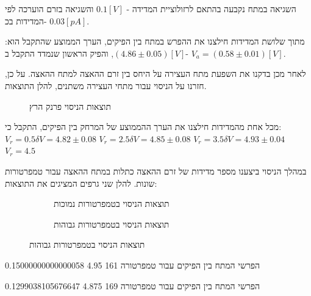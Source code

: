 \documentclass{article}
\begin{document}
השגיאה במתח נקבעה בהתאם לרזולוציית המדידה - 
$0.1 [V]$
והשגיאה בזרם הוערכה לפי המדידות בכ- 
$0.03 [pA]$.


מתוך שלושת המדידות חילצנו את ההפרש במתח בין הפיקים, הערך הממוצע שהתקבל הוא:
$(4.86 \pm 0.05)[V]$,
והפיק הראשון שנמדד התקבל ב- 
$V_a = (0.58 \pm 0.01)[V]$.


לאחר מכן בדקנו את השפעת מתח העצירה על היחס בין זרם ההאצה למתח ההאצה.
על כן, חזרנו על הניסוי עבור מתחי העצירה משתנים, להלן התוצאות.

\begin{figure}[H]
	\begin{center}
	\resizebox{\textwidth}{!}{}
	\end{center}
	\caption{תוצאות הניסוי פרנק הרץ}
	\label{graph:first_mesurment}
\end{figure}

מכל אחת מהמדידות חילצנו את הערך ההממוצע של המרחק בין הפיקים, התקבל כי:
$V_r=0.5 \delta V =4.82 \pm 0.08$
$V_r=2.5 \delta V =4.85 \pm 0.08$
$V_r=3.5 \delta V =4.93 \pm 0.04$
$V_r=4.5 $


במהלך הניסוי ביצענו מספר מדידות של זרם ההאצה כתלות במתח ההאצה עבור טמפרטורות שונות.
להלן שני גרפים המציגים את התוצאות:

\begin{figure}[H]
    \begin{subfigure}[b]{\textwidth}
    	\centering
    	\resizebox{\textwidth}{!}{}
    	\caption{תוצאות הניסוי בטמפרטורות נמוכות}
    	\label{fig:Changing_temp_0-10v}
    \end{subfigure}
    \hfill
    \begin{subfigure}[b]{\textwidth}
    	\centering
    	\resizebox{\textwidth}{!}{}
    	\caption{תוצאות הניסוי בטמפרטורות גבוהות}
    	\label{fig:Changing_temp_0-30v}
    \end{subfigure}
\end{figure}

הפרשי המתח בין הפיקים עבור טמפרטורה 161
4.95
0.15000000000000058

הפרשי המתח בין הפיקים עבור טמפרטורה 169
4.875
0.1299038105676647
\end{document}
